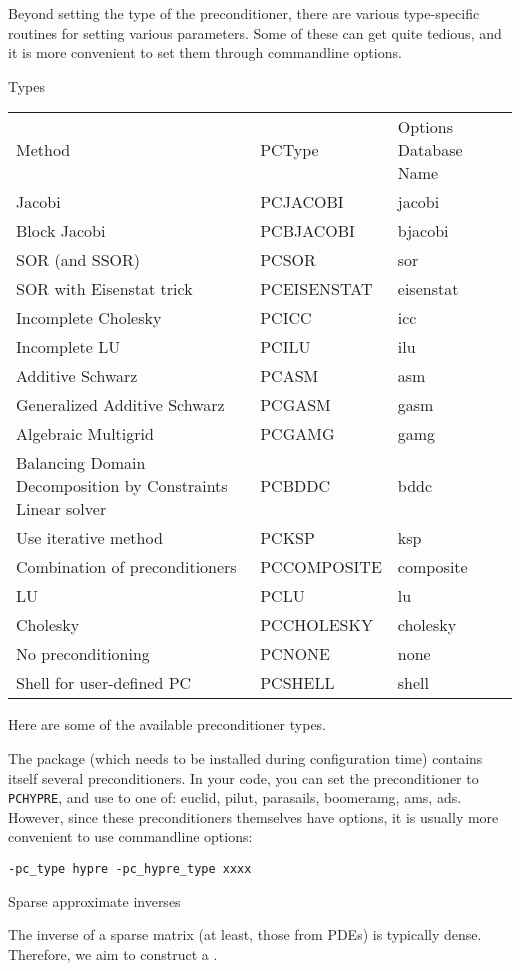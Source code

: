Beyond setting the type of the preconditioner, there are various
type-specific routines for setting various parameters. Some of these
can get quite tedious, and it is more convenient to set them through
commandline options.

 {Types}

\begin{tabular}{|l|l|l|}
Method&PCType&Options Database Name\\
Jacobi&PCJACOBI&jacobi\\
Block Jacobi&PCBJACOBI&bjacobi\\
SOR (and SSOR)&PCSOR&sor\\
SOR with Eisenstat trick&PCEISENSTAT&eisenstat\\
Incomplete Cholesky&PCICC&icc\\
Incomplete LU&PCILU&ilu\\
Additive Schwarz&PCASM&asm\\
Generalized Additive Schwarz&PCGASM&gasm\\
Algebraic Multigrid&PCGAMG&gamg\\
Balancing Domain Decomposition by Constraints Linear solver&PCBDDC&bddc\\
Use iterative method&PCKSP&ksp\\
Combination of preconditioners&PCCOMPOSITE&composite\\
LU&PCLU&lu\\
Cholesky&PCCHOLESKY&cholesky\\
No preconditioning&PCNONE&none\\
Shell for user-defined PC&PCSHELL&shell  \\
\end{tabular}

Here are some of the available preconditioner types.

The  package
(which needs to be installed during configuration time)
contains itself several preconditioners.
In your code, you can set the preconditioner to \lstinline{PCHYPRE},
and use  to one of:
euclid, pilut, parasails, boomeramg, ams, ads.
However, since these preconditioners themselves have options,
it is usually more convenient to use commandline options:
\begin{verbatim}
-pc_type hypre -pc_hypre_type xxxx
\end{verbatim}

 {Sparse approximate inverses}

The inverse of a sparse matrix (at least, those from \acp{PDE}) is typically dense.
Therefore, we aim to construct a .

